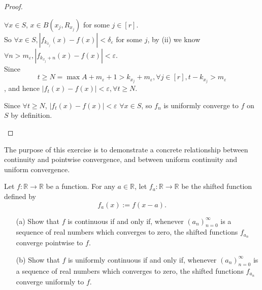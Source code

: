 \begin{proof}
\begin{itemize}
            \begin{explanation}
                $\forall x \in S$, $x \in B(x_j, R_{x_j})$ for some $j \in [r]$.\\
                So $\forall x \in S, |f_{k_{x_j}}(x) - f(x)| < \delta_{\varepsilon}$ for some $j$, by (ii) we know $\forall n > m_{\varepsilon}, |f_{k_{x_j}+n}(x) - f(x)| < \varepsilon$. \\
                Since 
                \[t \geq N = \max{A} + m_{\varepsilon} + 1 > k_{x_j} + m_\varepsilon , \forall j \in [r],  t - k_{x_j} > m_\varepsilon
                \]
                , and hence $|f_t(x)-f(x)| < \varepsilon, \forall t\geq N$.
            \end{explanation}
            Since $\forall t \geq N$, $|f_t(x)-f(x)| < \varepsilon$ $\forall x \in S$, so $f_n$ is uniformly converge to $f$ on $S$ by definition.
            
    \end{itemize}
\end{proof}
\begin{problem}[15pts]
    The purpose of this exercise is to demonstrate a concrete relationship between continuity and pointwise convergence, and between uniform continuity and uniform convergence. 

Let $f:\mathbb{R} \to \mathbb{R}$ be a function. For any $a \in \mathbb{R}$, let $f_a : \mathbb{R} \to \mathbb{R}$ be the shifted function defined by
\[
f_a(x) := f(x - a).
\]

\begin{enumerate}
  \item[(a)] Show that $f$ is continuous if and only if, whenever $(a_n)_{n=0}^\infty$ is a sequence of real numbers which converges to zero, the shifted functions $f_{a_n}$ converge pointwise to $f$.

  \item[(b)] Show that $f$ is uniformly continuous if and only if, whenever $(a_n)_{n=0}^\infty$ is a sequence of real numbers which converges to zero, the shifted functions $f_{a_n}$ converge uniformly to $f$.
\end{enumerate}

\end{problem}
